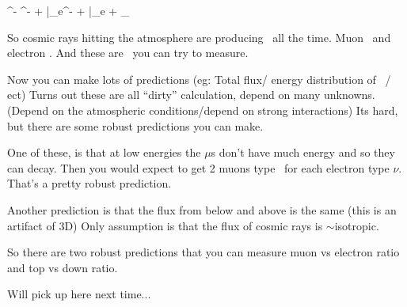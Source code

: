 {\be
\pi^- \rightarrow \mu^- + \bar{\nu}_\nu \rightarrow e^- + \bar{\nu_e} + \nu_\mu
\ee

So cosmic rays hitting the atmosphere are producing \nus\ all the time.  
Muon \nus\ and electron \nus. 
And these are \nus\ you can try to measure. 

Now you can make lots of predictions (eg: Total flux/ energy distribution of \nus\ / ect)
Turns out these are all ``dirty'' calculation,  depend on many unknowns. (Depend on the atmospheric conditions/depend on strong interactions) 
Its hard, but there are some robust predictions you can make. 

One of these, is that at low energies the $\mu$s don't have much energy and so they can decay. 
Then you would expect to get 2 muons type \nus\ for each electron type $\nu$. 
That's a pretty robust prediction. 

Another prediction is that the flux from below and above is the same (this is an artifact of 3D) 
Only assumption is that the flux of cosmic rays is $\sim$isotropic.

So there are two robust predictions that you can measure muon vs electron ratio and top vs down ratio. 

Will pick up here next time...

 




}



